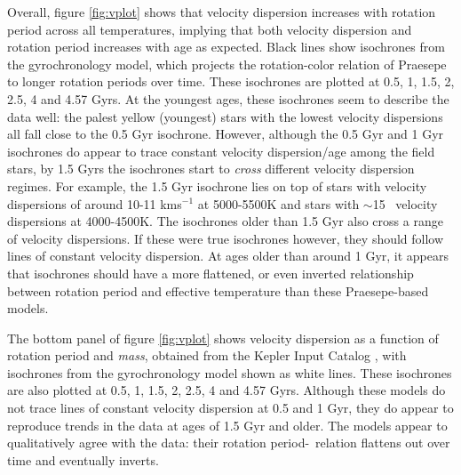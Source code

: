Overall, figure \ref{fig:vplot} shows that velocity dispersion increases with
rotation period across all temperatures, implying that both velocity
dispersion and rotation period increases with age as expected.
Black lines show isochrones from the \citep{angus2019} gyrochronology model,
which projects the rotation-color relation of Praesepe to longer rotation
periods over time.
These isochrones are plotted at 0.5, 1, 1.5, 2, 2.5, 4 and 4.57 Gyrs.
At the youngest ages, these isochrones seem to describe the data well: the
palest yellow (youngest) stars with the lowest velocity dispersions all fall
close to the 0.5 Gyr isochrone.
However, although the 0.5 Gyr and 1 Gyr isochrones do appear to trace constant
velocity dispersion/age among the field stars, by 1.5 Gyrs the isochrones
start to {\it cross} different velocity dispersion regimes.
For example, the 1.5 Gyr isochrone lies on top of stars with velocity
dispersions of around 10-11 kms$^{-1}$ at 5000-5500K and stars with $\sim$15
\kms\ velocity dispersions at 4000-4500K.
The isochrones older than 1.5 Gyr also cross a range of velocity dispersions.
If these were true isochrones however, they should follow lines of constant
velocity dispersion.
At ages older than around 1 Gyr, it appears that isochrones should have a more
flattened, or even inverted relationship between rotation period and effective
temperature than these Praesepe-based models.

The bottom panel of figure \ref{fig:vplot} shows velocity dispersion as a
function of rotation period and {\it mass}, obtained from the Kepler Input
Catalog \citep{brown2011}, with isochrones from the \citep{spada2019}
gyrochronology model shown as white lines.
These isochrones are also plotted at 0.5, 1, 1.5, 2, 2.5, 4 and 4.57 Gyrs.
Although these models do not trace lines of constant velocity dispersion at
0.5 and 1 Gyr, they do appear to reproduce trends in the data at ages of 1.5
Gyr and older.
The \citet{spada2019} models appear to qualitatively agree with the data:
their rotation period-\teff\ relation flattens out over time and eventually
inverts.

